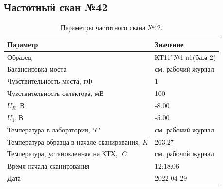 \subsection{Частотный скан №42}
\begin{table}[!ht]
    \centering
    \caption{Параметры частотного скана №42.}
    \begin{tabular}{|l|l|}
        \hline
        Параметр                                       & Значение                  \\ \hline
        Образец                                        & КТ117№1 п1(база 2)        \\ \hline
        Балансировка моста                             & см. рабочий журнал        \\ \hline
        Чувствительность моста, пФ                     & 1                         \\ \hline
        Чувствительность селектора, мВ                 & 100                       \\ \hline
        $U_R$, В                                       & -8.00                     \\ \hline
        $U_1$, В                                       & -5.00                     \\ \hline
        Температура в лаборатории, $^\circ C$          & см. рабочий журнал        \\ \hline
        Температура образца в начале сканирования, $K$ & 263.27                    \\ \hline
        Температура, установленная на КТХ, $^\circ C$  & см. рабочий журнал        \\ \hline
        Время начала сканирования                      & 12:18:06                  \\ \hline
        Дата                                           & 2022-04-29                \\ \hline
    \end{tabular}
    \label{table:frequency_scan_42}
\end{table}

